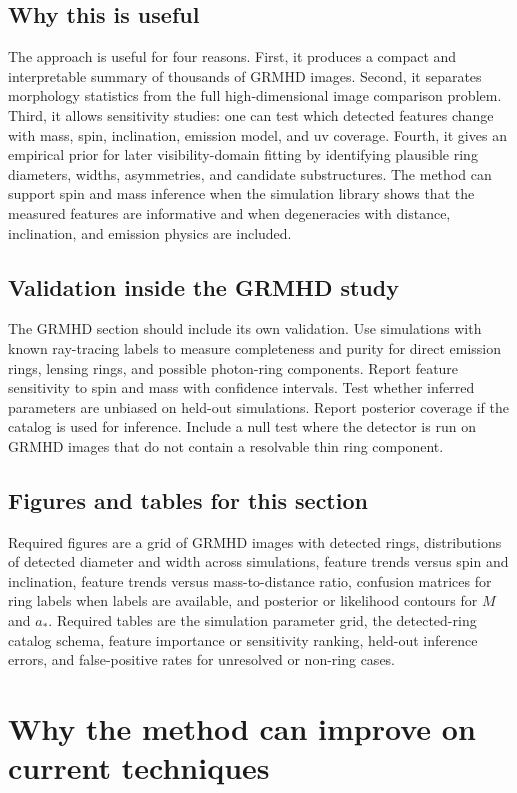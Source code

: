 \documentclass[11pt]{article}
\begin{document}
\subsection{Why this is useful}
The approach is useful for four reasons. First, it produces a compact and interpretable summary of thousands of GRMHD images. Second, it separates morphology statistics from the full high-dimensional image comparison problem. Third, it allows sensitivity studies: one can test which detected features change with mass, spin, inclination, emission model, and uv coverage. Fourth, it gives an empirical prior for later visibility-domain fitting by identifying plausible ring diameters, widths, asymmetries, and candidate substructures. The method can support spin and mass inference when the simulation library shows that the measured features are informative and when degeneracies with distance, inclination, and emission physics are included.

\subsection{Validation inside the GRMHD study}
The GRMHD section should include its own validation. Use simulations with known ray-tracing labels to measure completeness and purity for direct emission rings, lensing rings, and possible photon-ring components. Report feature sensitivity to spin and mass with confidence intervals. Test whether inferred parameters are unbiased on held-out simulations. Report posterior coverage if the catalog is used for inference. Include a null test where the detector is run on GRMHD images that do not contain a resolvable thin ring component.

\subsection{Figures and tables for this section}
Required figures are a grid of GRMHD images with detected rings, distributions of detected diameter and width across simulations, feature trends versus spin and inclination, feature trends versus mass-to-distance ratio, confusion matrices for ring labels when labels are available, and posterior or likelihood contours for $M$ and $a_*$. Required tables are the simulation parameter grid, the detected-ring catalog schema, feature importance or sensitivity ranking, held-out inference errors, and false-positive rates for unresolved or non-ring cases.

\section{Why the method can improve on current techniques}
\end{document}
